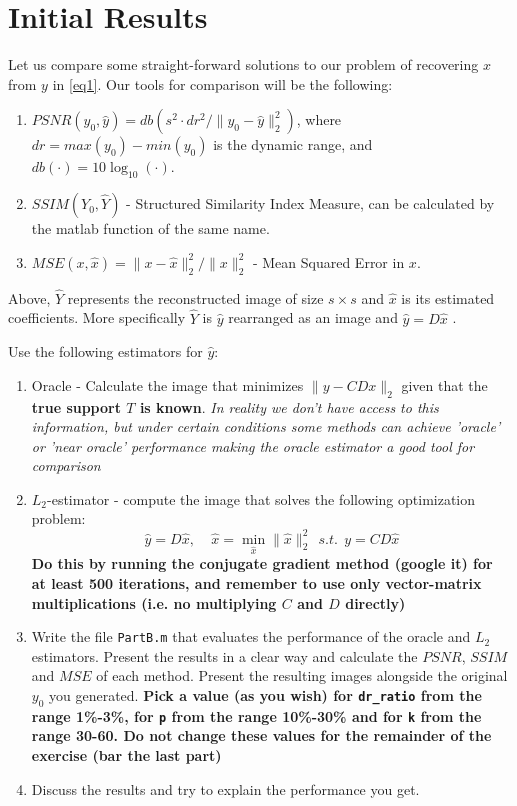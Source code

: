 \documentclass[]{article}
\newcommand{\code}{\item[\faKeyboardO]}
\newcommand{\quest}{\item[\faPencil]}
\begin{document}
\section { Initial Results  }
\label{sec:init}
Let us compare some straight-forward solutions to our problem of recovering $x$ from $y$ in \eqref{eq1}. Our tools for comparison will be the following: 
\begin{enumerate}
	\item  $PSNR(y_0,\hat{y}) = db(s^2\cdot dr^2 / \|y_0-\hat{y}\|_2^2) $, where $dr=max(y_0) - min(y_0)$ is the dynamic range, and $db(\cdot) = 10\log_{10}(\cdot)$.   
	\item $SSIM(Y_0,\hat{Y})$ - Structured Similarity Index Measure, can be calculated by the matlab function of the same name. 
	\item $MSE(x,\hat{x})=\|x-\hat{x}\|^2_2 / \|x\|^2_2$ - Mean Squared Error in $x$.
\end{enumerate}

Above, $\hat Y$ represents the reconstructed image of size $s\times s$ and $\hat x$ is its estimated coefficients. More specifically $\hat Y$ is $\hat y$ rearranged as an image and $\hat y = D\hat x $  .  


Use the following estimators for $\hat{y}$: 
\begin{enumerate}
	\item Oracle - Calculate the image that minimizes $\|y-CDx\|_2$ given that the \textbf{true support $T$ is known}. \emph{In reality we don't have access to this information, but under certain conditions some methods can achieve 'oracle' or 'near oracle' performance making the oracle estimator a good tool for comparison}
	\item $L_2$-estimator - compute the image that solves the following optimization problem: 
	$$ \hat{y} = D\hat{x}, \ \ \ \ \ \hat{x} = \min_{\hat{x}} \|\hat{x}\|^2_2 \ \ s.t.\ \ y = CD\hat{x}   $$
	\textbf{Do this by running the conjugate gradient method (google it) for at least 500 iterations, and remember to use only vector-matrix multiplications (i.e. no multiplying $C$ and $D$ directly)  }
	\code Write the file \lstinline|PartB.m| that evaluates the performance of the oracle and $L_2$ estimators. Present the results in a clear way and calculate the $PSNR$, $SSIM$ and $MSE$ of each method. Present the resulting images alongside the original $y_0$ you generated. \textbf{Pick a value (as you wish) for \lstinline|dr_ratio| from the range 1\%-3\%, for \lstinline|p| from the range 10\%-30\% and for \lstinline|k| from  the range 30-60. Do not change these values for the remainder of the exercise (bar the last part)}  
	\quest Discuss the results and try to explain the performance you get.
	
\end{enumerate} 
\end{document}
